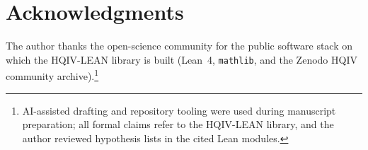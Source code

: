 \documentclass[11pt]{amsart}
\begin{document}
\section*{Acknowledgments}
The author thanks the open-science community for the public software stack on which the HQIV-LEAN library is built (Lean~4, \texttt{mathlib}, and the Zenodo HQIV community archive).\footnote{AI-assisted drafting and repository tooling were used during manuscript preparation; all formal claims refer to the HQIV-LEAN library, and the author reviewed hypothesis lists in the cited Lean modules.}



\end{document}
